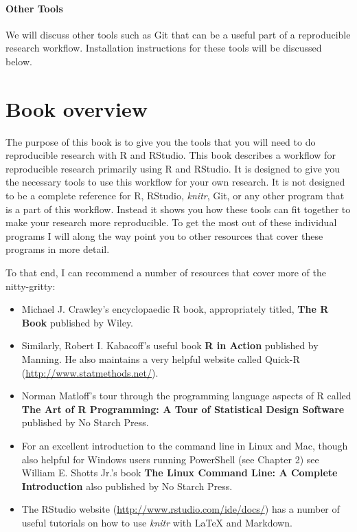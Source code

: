 \documentclass[krantz1]{krantz}
\begin{document}
\paragraph{Other Tools}

We will discuss other tools such as Git that can be a useful part of a reproducible research workflow. Installation instructions for these tools will be discussed below.


\section{Book overview}

The purpose of this book is to give you the tools that you will need to do reproducible research with R and RStudio. This book describes a workflow for reproducible research primarily using R and RStudio. It is designed to give you the necessary tools to use this workflow for your own research. It is not designed to be a complete reference for R, RStudio, {\emph{knitr}}, Git, or any other program that is a part of this workflow. Instead it shows you how these tools can fit together to make your research more reproducible. To get the most out of these individual programs I will along the way point you to other resources that cover these programs in more detail.

To that end, I can recommend a number of resources that cover more of the nitty-gritty:

\begin{itemize}
    \item Michael J. Crawley's \citeyearpar{Crawley2013} encyclopaedic R book, appropriately titled, \textbf{The R Book} published by Wiley.
    
    \item Similarly, Robert I. Kabacoff's \citeyearpar{Kabacoff2012} useful book \textbf{R in Action} published by Manning. He also maintains a very helpful website called Quick-R (\url{http://www.statmethods.net/}).

    \item Norman Matloff's \citeyearpar{Matloff2011} tour through the programming language aspects of  R called \textbf{The Art of R Programming: A Tour of Statistical Design Software} published by No Starch Press.
    
    \item For an excellent introduction to the command line in Linux and Mac, though also helpful for Windows users running PowerShell (see Chapter 2) see William E. Shotts Jr.'s \citeyearpar{ShottsJr2012} book \textbf{The Linux Command Line: A Complete Introduction} also published by No Starch Press.
    
    \item The RStudio website (\url{http://www.rstudio.com/ide/docs/}) has a number of useful tutorials on how to use {\emph{knitr}} with LaTeX and Markdown.
\end{itemize}
\end{document}
